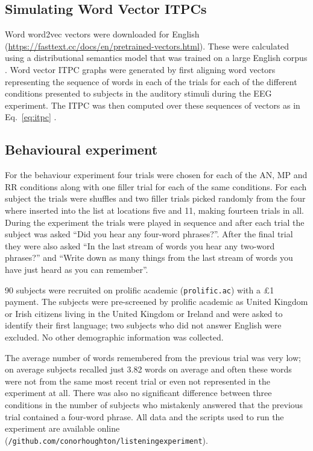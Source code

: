 \documentclass[10pt,letterpaper]{article}
\newcommand{\citet}[1]{\cite{#1}}
\begin{document}
\subsection*{Simulating Word Vector ITPCs}

Word word2vec vectors were downloaded for English (\url{https://fasttext.cc/docs/en/pretrained-vectors.html}). These were calculated using a distributional semantics model that was trained on a large English corpus \citet{Bojanowski2017}. Word vector ITPC graphs were generated by first aligning word vectors representing the sequence of words in each of the trials for each of the different conditions presented to subjects in the auditory stimuli during the EEG experiment. The ITPC was then computed over these sequences of vectors as in Eq.~\ref{eq:itpc} \citet{FrankYang2018}.

\subsection*{Behavioural experiment}

For the behaviour experiment four trials were chosen for each of the AN, MP and RR conditions along with one filler trial for each of the same conditions. For each subject the trials were shuffles and two filler trials picked randomly from the four where inserted into the list at locations five and 11, making fourteen trials in all. During the experiment the trials were played in sequence and after each trial the subject was asked ``Did you hear any four-word phrases?''. After the final trial they were also asked ``In the last stream of words you hear any two-word phrases?'' and ``Write down as many things from the last stream of words you have just heard as you can remember''.

90 subjects were recruited on prolific academic (\texttt{prolific.ac}) with a £1 payment. The subjects were pre-screened by prolific academic as United Kingdom or Irish citizens living in the United Kingdom or Ireland and were asked to identify their first language; two subjects who did not answer English were excluded. No other demographic information was collected. 

The average number of words remembered from the previous trial was very low; on average subjects recalled just 3.82 words on average and often these words were not from the same most recent trial or even not represented in the experiment at all. There was also no significant difference between three conditions in the number of subjects who mistakenly answered that the previous trial contained a four-word phrase. All data and the scripts used to run the experiment are available online (\texttt{/github.com/conorhoughton/listening\textunderscore experiment}).  
\end{document}
